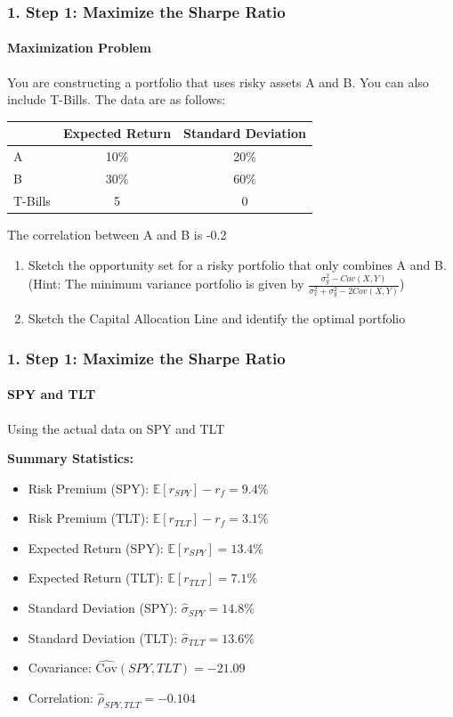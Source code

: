 \documentclass{beamer}
\begin{document}
\begin{practiceframe}[t]
    \frametitle{1. Step 1: Maximize the Sharpe Ratio}
    \framesubtitle{Maximization Problem}

    \footnotesize
    You are constructing a portfolio that uses risky assets A and B.   You can also include T-Bills.   The data are as follows:

    \begin{table}
    \begin{tabular}{lcc}
    \toprule
    & Expected Return & Standard Deviation \\
    \midrule
    A & 10\% & 20\% \\
    B & 30\% & 60\% \\
    T-Bills & 5 & 0 \\
    \bottomrule
    \end{tabular}  
    \end{table} 
    The correlation between A and B is -0.2
    \begin{enumerate}
        \item Sketch the opportunity set for a risky portfolio that only combines A and B.  (Hint: The minimum variance portfolio is given by $\frac{\sigma_y^2 - Cov(X,Y)}{\sigma_x^2 + \sigma_y^2 -2Cov(X,Y)}$)
        \item Sketch the Capital Allocation Line and identify the optimal portfolio
    \end{enumerate}
    
\end{practiceframe}


\begin{frame}[t]
    \frametitle{1. Step 1: Maximize the Sharpe Ratio}
    \framesubtitle{SPY and TLT}

    Using the actual data on SPY and TLT
    \vspace{1em}

    \textbf{Summary Statistics:}
    \begin{itemize}
        \item Risk Premium (SPY): $\mathbb{E}[r_{SPY}] - r_{f} = 9.4\%$
        \item Risk Premium (TLT): $\mathbb{E}[r_{TLT}] - r_{f} = 3.1\%$
         \item Expected Return (SPY): $\mathbb{E}[r_{SPY}] = 13.4\%$
        \item Expected Return (TLT): $\mathbb{E}[r_{TLT}] = 7.1\%$
        \item Standard Deviation (SPY): $\hat{\sigma}_{SPY} = 14.8\%$
        \item Standard Deviation (TLT): $\hat{\sigma}_{TLT} = 13.6\%$
        \item Covariance: $\widehat{\text{Cov}}(SPY,TLT) = -21.09$
        \item Correlation: $\hat{\rho}_{SPY,TLT} = -0.104$
    \end{itemize}

\end{frame}
\end{document}
